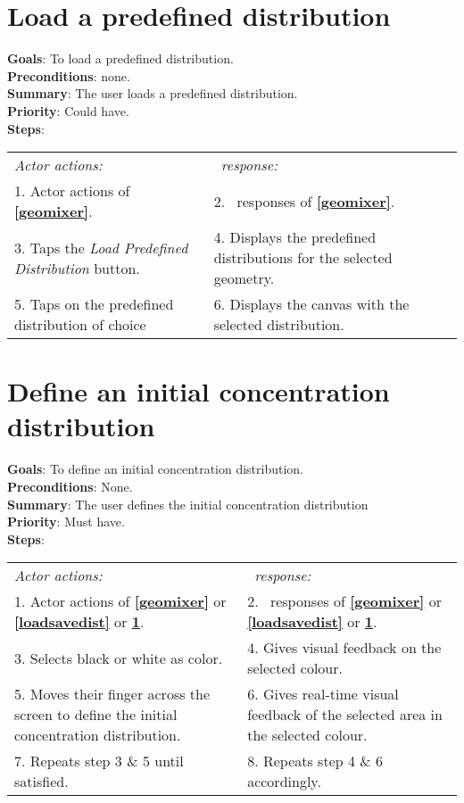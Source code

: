   \section{Load a predefined distribution}
  \label{loadpreddist}
  \textbf{Goals}: To load a predefined distribution.\\
  \textbf{Preconditions}: none.\\
  \textbf{Summary}: The user loads a predefined distribution.\\
  \textbf{Priority}: Could have.\\
  \textbf{Steps}: \\
  \begin{tabular}{ p{} p{} }
  	\emph{Actor actions:} & \emph{\projectname\ response:} \\
  	1. Actor actions of \textbf{\ref{geomixer}}. & 2. \projectname\ responses of \textbf{\ref{geomixer}}. \\
	3. Taps the \emph{Load Predefined Distribution} button. & 4. Displays the predefined distributions for the selected geometry. \\
	5. Taps on the predefined distribution of choice & 6. Displays the canvas with the selected distribution. \\
  \end{tabular}

  \section{Define an initial concentration distribution}
  \label{initdist}
  \textbf{Goals}: To define an initial concentration distribution.\\
  \textbf{Preconditions}: None. \\ %
  \textbf{Summary}: The user defines the initial concentration distribution\\
  \textbf{Priority}: Must have.\\
  \textbf{Steps}: \\
  \begin{tabular}{ p{} p{} }
  	\emph{Actor actions:} & \emph{\projectname\ response:} \\
  	1. Actor actions of \textbf{\ref{geomixer}} or \textbf{\ref{loadsavedist}} or \textbf{\ref{loadpreddist}}. & 2. \projectname\ responses of \textbf{\ref{geomixer}} or \textbf{\ref{loadsavedist}} or  \textbf{\ref{loadpreddist}}.\\
	3. Selects black or white as color. & 4. Gives visual feedback on the selected colour. \\
	5. Moves their finger across the screen to define the initial concentration distribution. & 6. Gives real-time visual feedback of the selected area in the selected colour.\\
    7. Repeats step 3 \& 5 until satisfied. & 8.	Repeats step 4 \& 6 accordingly. \\
      \end{tabular}
      
